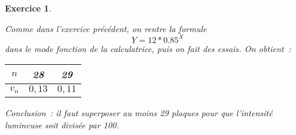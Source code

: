 \documentclass[10pt]{article}
\newtheorem{exo}{Exercice}
\begin{document}
\begin{exo}
\begin{enumerate}
\medskip

Comme dans l'exercice précédent, on rentre la formule \[Y=12*0.85^X\] dans le mode fonction  de la calculatrice, puis on fait des essais. On obtient~:

\begin{center}
\begin{tabular}{|c|c|c|}
\hline
	$n$&28&29\\\hline
$v_n$&$0,13$&$0,11$\\\hline
\end{tabular}
\end{center}

\medskip

Conclusion~: il faut superposer au moins 29 plaques pour que l'intensité lumineuse soit divisée par 100.

\end{enumerate}

\end{exo}
\end{document}
